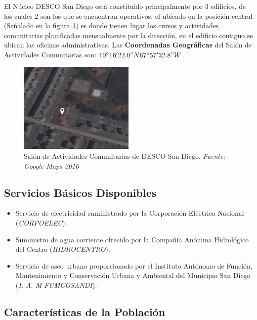 \documentclass[11pt, a4paper, twosides]{report}
\begin{document}
El Núcleo DESCO San Diego está constituido principalmente por 3 edificios, de los cuales 2 son los que se encuentran operativos, el ubicado en la posición central (Señalado en la figura \ref{f2}) es donde tienen lugar los cursos y actividades comunitarias planificadas mensualmente por la dirección, en el edificio contiguo se ubican las oficinas administrativas. Las \textbf{Coordenadas Geográficas} del Salón de Actividades Comunitarias son: $10^{\circ}16'22.0"N 67^{\circ}57'32.8"W$.

\begin{figure}[h]
	\centering
	\includegraphics[width=0.5\textwidth]{fig2}
	\caption{Salón de Actividades Comunitarias de DESCO San Diego. \textit{Fuente: Google Maps 2016}}
	\label{f2}
\end{figure}
\subsection{Servicios Básicos Disponibles}
\begin{itemize}
	\item Servicio de electricidad suministrado por la Corporación Eléctrica Nacional (\textit{CORPOELEC}).
	\item Suministro de agua corriente ofrecido por la Compañía Anónima Hidrológico del Centro (\textit{HIDROCENTRO}).
	\item Servicio de aseo urbano proporcionado por el Instituto Autónomo de Función, Mantenimiento y Conservación Urbana y Ambiental del Municipio San Diego (\textit{I. A. M FUMCOSANDI}).
\end{itemize}

\subsection{Características de la Población}
\end{document}
